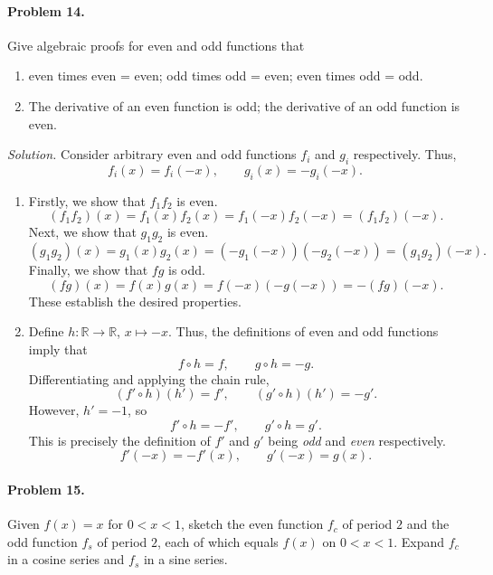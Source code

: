 \documentclass[10pt]{article}
\begin{document}
        \paragraph{Problem 14.} Give algebraic proofs for even and odd functions that 
        \begin{enumerate}
                \item even times even = even; odd times odd = even; even times odd = odd.
                \item The derivative of an even function is odd; the derivative of an odd function is even.
        \end{enumerate}
        \textit{Solution.} Consider arbitrary even and odd functions $f_i$ and $g_i$ respectively. Thus,
        \[
                f_i(x) = f_i(-x), \qquad g_i(x) = -g_i(-x).
        \]
        \begin{enumerate}
                \item Firstly, we show that $f_1f_2$ is even.
                \[
                        (f_1f_2)(x) = f_1(x)f_2(x) = f_1(-x)f_2(-x) = (f_1f_2)(-x).
                \]
                Next, we show that $g_1g_2$ is even.
                \[
                        (g_1g_2)(x) = g_1(x)g_2(x) = (-g_1(-x))(-g_2(-x)) = (g_1g_2)(-x).
                \]
                Finally, we show that $fg$ is odd.
                \[
                        (fg)(x) = f(x)g(x) = f(-x)(-g(-x)) = -(fg)(-x).
                \]
                These establish the desired properties.

                \item Define $h\colon \mathbb{R}\to \mathbb{R}$, $x \mapsto -x$.
                Thus, the definitions of even and odd functions imply that
                \[
                        f\circ h = f, \qquad g\circ h = -g.
                \]
                Differentiating and applying the chain rule,
                \[
                        (f'\circ h)(h') = f', \qquad (g'\circ h)(h') = -g'.
                \]
                However, $h' = -1$, so
                \[
                        f'\circ h = -f', \qquad g'\circ h = g'.
                \]
                This is precisely the definition of $f'$ and $g'$ being \textit{odd} and \textit{even} respectively.
                \[
                        f'(-x) = -f'(x), \qquad g'(-x) = g(x).
                \]      
        \end{enumerate}

        \paragraph{Problem 15.} Given $f(x) = x$ for $0 < x < 1$, sketch the even function $f_c$ of period $2$ and the odd function $f_s$
        of period $2$, each of which equals $f(x)$ on $0 < x < 1$. Expand $f_c$ in a cosine series and $f_s$ in a sine series. \\
\end{document}
